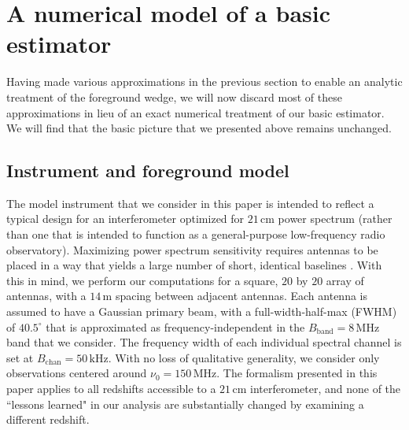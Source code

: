 \documentclass[twocolumn,aps,prd,nofootinbib,showpacs]{revtex4-1}
\begin{document}
\section{A numerical model of a basic estimator}
\label{sec:basicEstNumerical}

Having made various approximations in the previous section to enable an analytic treatment of the foreground wedge, we will now discard most of these approximations in lieu of an exact numerical treatment of our basic estimator.  We will find that the basic picture that we presented above remains unchanged.

\subsection{Instrument and foreground model}
The model instrument that we consider in this paper is intended to reflect a typical design for an interferometer optimized for $21\,\textrm{cm}$ power spectrum (rather than one that is intended to function as a general-purpose low-frequency radio observatory).  Maximizing power spectrum sensitivity requires antennas to be placed in a way that yields a large number of short, identical baselines \cite{Parsons2012a,Pober2014}.  With this in mind, we perform our computations for a square, $20$ by $20$ array of antennas, with a $14\,\textrm{m}$ spacing between adjacent antennas.  Each antenna is assumed to have a Gaussian primary beam, with a full-width-half-max (FWHM) of $40.5^\circ$ that is approximated as frequency-independent in the $B_\textrm{band} = 8\,\textrm{MHz}$ band that we consider.  The frequency width of each individual spectral channel is set at $B_\textrm{chan} = 50\,\textrm{kHz}$.  With no loss of qualitative generality, we consider only observations centered around $\nu_0 = 150\,\textrm{MHz}$.  The formalism presented in this paper applies to all redshifts accessible to a $21\,\textrm{cm}$ interferometer, and none of the ``lessons learned" in our analysis are substantially changed by examining a different redshift.
\end{document}
